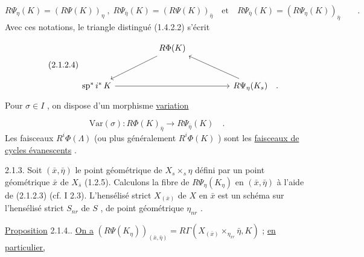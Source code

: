 \begin{equation*}
R\Psi_{\eta}(K) = (R\Psi(K))_{\eta} \;,\; R\Psi_{\bar{\eta}}(K) = (R\Psi(K))_{\bar{\eta}} \quad \text{et} \quad R\Psi_{\bar{\eta}}(K) = (R\Psi_{\eta}(K))_{\bar{\eta}} \qquad .
\end{equation*}
Avec ces notations, le triangle distingué (1.4.2.2) s'écrit 



\begin{equation}\tag{2.1.2.4}
\begin{tikzcd}[row sep=large, column sep=huge]
& R\Phi(K) \arrow[dl] & \\
\mathrm{sp}^*\, i^*\, K \arrow[rr] & & R\Psi_\eta(K_s) \arrow[ul] \quad .
\end{tikzcd}
\end{equation}
Pour $\sigma \in I$ , on dispose d'un morphisme \underline{variation}

\begin{equation}\tag{2.1.2.5}
\mathrm{Var}(\sigma) : R\Phi(K)_{\bar\eta} \longrightarrow R\Psi_{\bar\eta}(K) \quad .
\end{equation}
Les faisceaux $R^i\Phi(\Lambda)$ (ou plus généralement $R^i\Phi(K)$ ) sont les \underline{faisceaux de cycles évanescents} .

2.1.3. Soit $(\bar x, \bar\eta)$ le point géométrique de $X_s \times_s \eta$ défini par un point géométrique $\bar x$ de $X_{\bar s}$ (1.2.5). Calculons la fibre de $R\Psi_\eta(K_\eta)$ en $(\bar x, \bar\eta)$ à l'aide de (2.1.2.3) (cf. I 2.3). L'hensélisé strict $X_{(\bar x)}$ de $X$ en $\bar x$ est un schéma sur l'hensélisé strict $S_{nr}$ de $S$ , de point géométrique $\eta_{nr}$ .

\underline{Proposition} 2.1.4.. \underline{On a} $(R\Psi(K_\eta))_{(\bar x,\bar\eta)} = R\Gamma(X_{(\bar x)} \times_{\eta_{xr}} \bar\eta , K)$ ; \underline{en particulier,}

